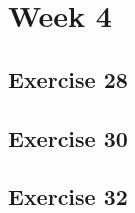 \documentclass[a4paper]{article}
\let\stdsection\section
\renewcommand\section{\newpage\stdsection}
\begin{document}
\section*{Week 4}

\subsection*{Exercise 28}















\newpage
\subsection*{Exercise 30}


\newpage
\subsection*{Exercise 32}





\newpage
\end{document}
